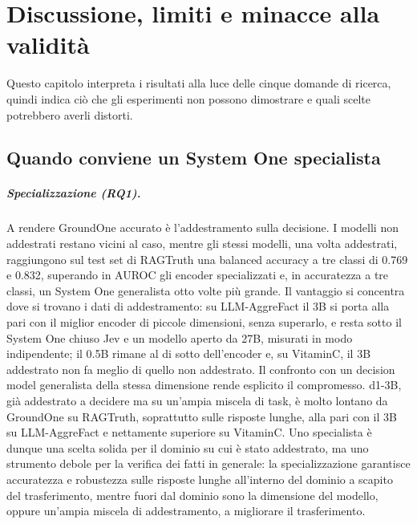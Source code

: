\chapter{Discussione, limiti e minacce alla validità}
\label{sec:discussion}


Questo capitolo interpreta i risultati alla luce delle cinque domande di ricerca, quindi indica ciò che gli esperimenti
non possono dimostrare e quali scelte potrebbero averli distorti.

\section{Quando conviene un System One specialista}
\label{sec:disc-synthesis}

\paragraph{Specializzazione (RQ1).} A rendere GroundOne accurato è l'addestramento sulla decisione. I modelli non
addestrati restano vicini al caso, mentre gli stessi modelli, una volta addestrati, raggiungono sul test set di RAGTruth
una balanced accuracy a tre classi di 0.769 e 0.832, superando in AUROC gli encoder specializzati e, in accuratezza a tre
classi, un System One generalista otto volte più grande. Il vantaggio si concentra dove si trovano i dati di
addestramento: su LLM-AggreFact il 3B si porta alla pari con il miglior encoder di piccole dimensioni, senza superarlo, e
resta sotto il System One chiuso Jev e un modello aperto da 27B, misurati in modo indipendente; il 0.5B rimane al di sotto
dell'encoder e, su VitaminC, il 3B addestrato non fa meglio di quello non addestrato. Il confronto con un decision model
generalista della stessa dimensione rende esplicito il compromesso. d1-3B, già addestrato a decidere ma su un'ampia
miscela di task, è molto lontano da GroundOne su RAGTruth, soprattutto sulle risposte lunghe, alla pari con il 3B su
LLM-AggreFact e nettamente superiore su VitaminC. Uno specialista è dunque una scelta solida per il dominio su cui è stato
addestrato, ma uno strumento debole per la verifica dei fatti in generale: la specializzazione garantisce accuratezza e
robustezza sulle risposte lunghe all'interno del dominio a scapito del trasferimento, mentre fuori dal dominio sono la
dimensione del modello, oppure un'ampia miscela di addestramento, a migliorare il trasferimento.


